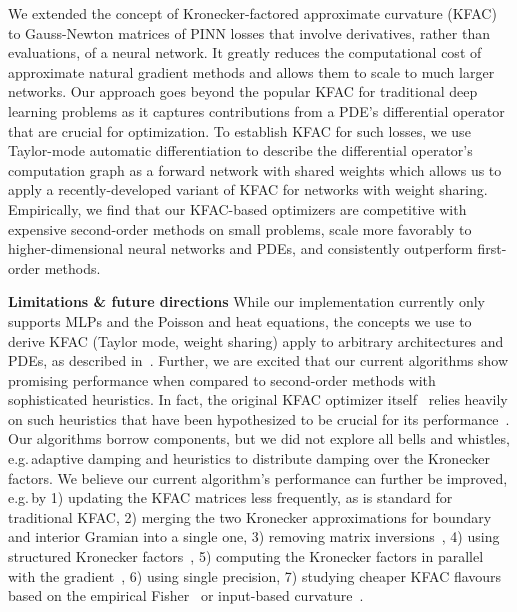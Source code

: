 We extended the concept of Kronecker-factored approximate curvature (KFAC) to Gauss-Newton matrices of PINN losses that involve derivatives, rather than evaluations, of a neural network.
It greatly reduces the computational cost of approximate natural gradient methods and allows them to scale to much larger networks.
Our approach goes beyond the popular KFAC for traditional deep learning problems as it captures contributions from a PDE's differential operator that are crucial for optimization.
To establish KFAC for such losses, we use Taylor-mode automatic differentiation to describe the differential operator's computation graph as a forward network with shared weights which allows us to apply a recently-developed variant of KFAC for networks with weight sharing.
Empirically, we find that our KFAC-based optimizers are competitive with expensive second-order methods on small problems, scale more favorably to higher-dimensional neural networks and PDEs, and consistently outperform first-order methods.

\textbf{Limitations \& future directions} While our implementation currently only supports MLPs and the Poisson and heat equations, the concepts we use to derive KFAC (Taylor mode, weight sharing) apply to arbitrary architectures and PDEs, as described in~.
Further, we are excited that our current algorithms show promising performance when compared to second-order methods with sophisticated heuristics.
In fact, the original KFAC optimizer itself~\cite{martens2015optimizing} relies heavily on such heuristics that have been hypothesized to be crucial for its performance~\cite{clarke2023adam}.
Our algorithms borrow components, but we did not explore all bells and whistles, e.g.\,adaptive damping and heuristics to distribute damping over the Kronecker factors.
We believe our current algorithm's performance can further be improved, e.g.\,by 1) updating the KFAC matrices less frequently, as is standard for traditional KFAC, 2) merging the two Kronecker approximations for boundary and interior Gramian into a single one, 3) removing matrix inversions~\cite{lin2023simplifying}, 4) using structured Kronecker factors~\cite{lin2023structured}, 5) computing the Kronecker factors in parallel with the gradient~\cite{dangel2020backpack}, 6) using single precision, 7) studying cheaper KFAC flavours based on the empirical Fisher~\cite{kunstner2019limitations} or input-based curvature~\cite{benzing2022gradient,petersen2023isaac}.